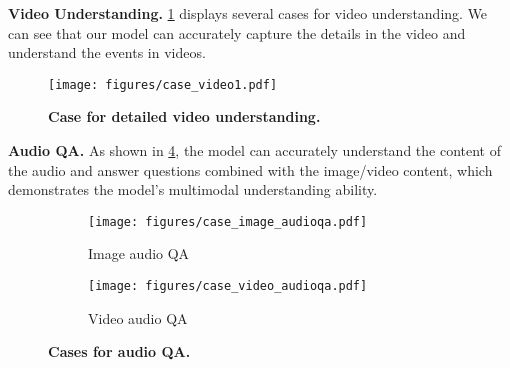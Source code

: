 
\textbf{Video Understanding.}
\cref{fig-exp_case_video1} displays several cases for video understanding.
We can see that our model can accurately capture the details in the video and understand the events in videos.

\begin{figure}[h]
    \centering
    \texttt{[image: figures/case\_video1.pdf]}
    \caption{
    \textbf{Case for detailed video understanding.}
    }
    \label{fig-exp_case_video1}
\end{figure}

\textbf{Audio QA.}
As shown in \cref{fig-exp_case_audio_qa}, the model can accurately understand the content of the audio and answer questions combined with the image/video content, which demonstrates the model's multimodal understanding ability.

\begin{figure}[h]
    \centering
    \begin{subfigure}{0.95\textwidth}
        \centering
        \texttt{[image: figures/case\_image\_audioqa.pdf]}
        \vspace{-8pt}
        \caption{Image audio QA}
        \label{fig:case_image_audioqa}
    \end{subfigure}
    \begin{subfigure}{0.95\textwidth}
        \centering
        \texttt{[image: figures/case\_video\_audioqa.pdf]}
        \vspace{-8pt}
        \caption{Video audio QA}
        \label{fig:case_video_audioqa}
    \end{subfigure}
    \caption{
    \textbf{Cases for audio QA.}
    }
    \label{fig-exp_case_audio_qa}
\end{figure}



